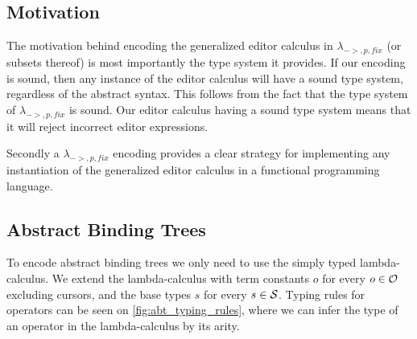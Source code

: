 \documentclass[sigplan,screen]{acmart}
\begin{document}

\subsection{Motivation}
The motivation behind encoding the generalized editor calculus in $\lambda_{->,p,fix}$ (or subsets thereof) is most importantly the type system it provides. If our encoding is sound, then any instance of the editor calculus will have a sound type system, regardless of the abstract syntax. This follows from the fact that the type system of $\lambda_{->,p,fix}$ is sound. Our editor calculus having a sound type system means that it will reject incorrect editor expressions. 

Secondly a $\lambda_{->,p,fix}$ encoding provides a clear strategy for implementing any instantiation of the generalized editor calculus in a functional programming language.

\subsection{Abstract Binding Trees}
To encode abstract binding trees we only need to use the simply typed lambda-calculus. We extend the lambda-calculus with term constants $o$ for every $o \in \mathcal{O}$ excluding cursors, and the base types $s$ for every $s \in \mathcal{S}$. 
Typing rules for operators can be seen on \cref{fig:abt_typing_rules}, where we can infer the type of an operator in the lambda-calculus by its arity. 
\end{document}
